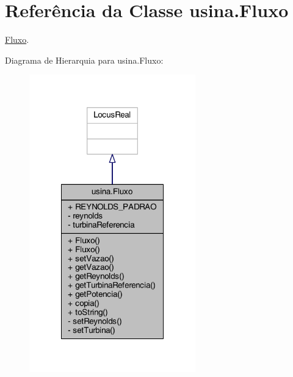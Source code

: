 \hypertarget{classusina_1_1_fluxo}{\section{Referência da Classe usina.\-Fluxo}
\label{classusina_1_1_fluxo}
}


\hyperlink{classusina_1_1_fluxo}{Fluxo}.  




Diagrama de Hierarquia para usina.\-Fluxo\-:
\nopagebreak
\begin{figure}[H]
\begin{center}
\leavevmode
\includegraphics[width=204pt]{classusina_1_1_fluxo__inherit__graph}
\end{center}
\end{figure}



